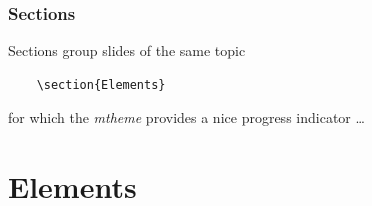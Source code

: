 \documentclass[12pt, compress]{beamer}
\begin{document}

\begin{frame}[fragile]
  \frametitle{Sections}
  Sections group slides of the same topic

  \begin{verbatim}
    \section{Elements}
  \end{verbatim}

  for which the \emph{mtheme} provides a nice progress indicator \ldots
\end{frame}

\section*{Elements}
\end{document}

